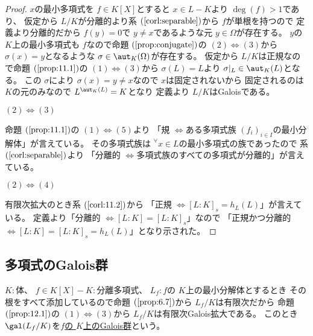 \documentclass[../master_galois_theory]{subfiles}
\begin{document}
\begin{proof}
  $x$の最小多項式を $f \in K[X]$とすると $x \in L - K$より $\deg(f) > 1$であり、
  仮定から $L/K$が分離的より系 $(\mathrm{\ref{corl:separable}})$から $f$が単根を持つので
  定義より分離的だから $f(y) = 0$で $y \neq x$であるような元 $y \in \Omega$が存在する。
  $y$の $K$上の最小多項式も $f$なので命題 $(\mathrm{\ref{prop:conjugate}})$の
  $(2) \Leftrightarrow (3)$から $\sigma(x) = y$となるような $\sigma \in \aut_K(\Omega)$が存在する。
  仮定から $L/K$は正規なので命題 $(\mathrm{\ref{prop:11.1}})$の $(1) \Leftrightarrow (3)$から $\sigma(L) = L$より
  $\sigma|_L \in \aut_K(L)$となる。
  この $\sigma$により $\sigma(x) = y \neq x$なので $x$は固定されないから
  固定されるのは $K$の元のみなので $L^{\aut_K(L)} = K$となり
  定義より $L/K$は\rm{Galois}である。

  $(2) \Leftrightarrow (3)$

  命題 $(\mathrm{\ref{prop:11.1}})$の $(1) \Leftrightarrow (5)$より
  「規 $\Leftrightarrow$ある多項式族 $(f_i)_{i \in I}$の最小分解体」が言えている。
  その多項式族は ${}^\forall x \in L$の最小多項式の族であったので
  系 $(\mathrm{\ref{corl:separable}})$より
  「分離的 $\Leftrightarrow$多項式族のすべての多項式が分離的」が言えている。

  $(2) \Leftrightarrow (4)$

  有限次拡大のとき系 $(\mathrm{\ref{corl:11.2}})$から
  「正規 $\Leftrightarrow [L:K]_s = h_L(L)$」が言えている。
  定義より「分離的 $\Leftrightarrow [L:K] = [L:K]_s$」なので
  「正規かつ分離的 $\Leftrightarrow [L:K] = [L:K]_s = h_L(L)$」となり示された。
\end{proof}

\subsection{多項式のGalois群}

\begin{defi} \label{defi:galoispolynomial}
  $K:$体、 $f \in K[X] - K:$分離多項式、 $L_f:f$の $K$上の最小分解体とするとき
  その根をすべて添加しているので命題 $(\mathrm{\ref{prop:6.7}})$から
  $L_f/K$は有限次だから
  命題 $(\mathrm{\ref{prop:12.1}})$の $(1) \Leftrightarrow (3)$から
  $L_f/K$は有限次\rm{Galois}拡大である。
  このとき $\gal(L_f/K)$を\underline{$f$の $K$上の\rm{Galois}群}という。
\end{defi}
\end{document}

